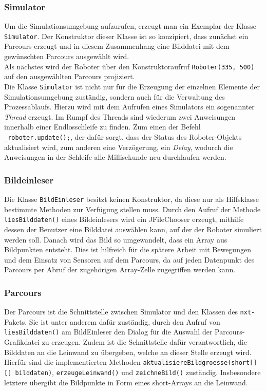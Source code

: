 \documentclass[paper=a4, DIV=calc, BCOR=15mm, twoside=on, onecolumn=on, open = right, titlepage =on, parskip =half, headsepline = on, footsepline = on, chapterprefix = off, appendixprefix = off, fontsize = 12pt, numbers = noenddot, abstract = on]{scrbook}
\begin{document}
\subsubsection{Simulator}

Um die Simulationsumgebung aufzurufen, erzeugt man ein Exemplar der Klasse \texttt{Si\-mu\-la\-tor}. Der Konstruktor dieser Klasse ist so konzipiert, dass zunächst ein Parcours erzeugt und in diesem Zusammenhang eine Bilddatei mit dem gewünschten Parcours ausgewählt wird.\\
Als nächstes wird der Roboter über den Konstruktoraufruf \texttt{Roboter(335, 500)} auf den ausgewählten Parcours projiziert.\\
Die Klasse \texttt{Simulator} ist nicht nur für die Erzeugung der einzelnen Elemente der Simulationsumgebung zuständig, sondern auch für die Verwaltung des Prozessablaufs. Hierzu wird mit dem Aufrufen eines Simulators ein sogenannter \emph{Thread} erzeugt. Im Rumpf des Threads sind wiederum zwei Anweisungen innerhalb einer Endlosschleife zu finden. Zum einen der Befehl \texttt{{\_}roboter.update();}, der dafür sorgt, dass der Status des Roboter-Objekts aktualisiert wird, zum anderen eine Verzögerung, ein \emph{Delay}, wodurch die Anweisungen in der Schleife alle Millisekunde neu durchlaufen werden. 


\subsubsection{Bildeinleser}
Die Klasse \texttt{BildEinleser} besitzt keinen Konstruktor, da diese nur als Hilfsklasse bestimmte Methoden zur Verfügung stellen muss. Durch den Aufruf der Methode\\
\texttt{liesBilddaten()} eines Bildeinlesers wird ein JFileChooser erzeugt, mithilfe dessen der Benutzer eine Bilddatei auswählen kann, auf der der Roboter simuliert werden soll. Danach wird das Bild so umgewandelt, dass ein Array aus Bildpunkten entsteht. Dies ist hilfreich für die spätere Arbeit mit Bewegungen und dem Einsatz von Sensoren auf dem Parcours, da auf jeden Datenpunkt des Parcours per Abruf der zugehörigen Array-Zelle zugegriffen werden kann.

\subsubsection{Parcours}
Der Parcours ist die Schnittstelle zwischen Simulator und den Klassen des \texttt{nxt-}Pakets. Sie ist unter anderem dafür zuständig, durch den Aufruf von \texttt{liesBilddaten()} am BildEinleser den Dialog für die Auswahl der Parcours-Grafikdatei zu erzeugen. Zudem ist die Schnittstelle dafür verantwortlich, die Bilddaten an die Leinwand zu übergeben, welche an dieser Stelle erzeugt wird. Hierfür sind die implementierten Methoden \texttt{aktualisiere\-Bildgroes\-se(short[][] bild\-daten)}, \texttt{er\-zeu\-ge\-Lein\-wand()} und \texttt{zeichneBild()} zuständig. Insbesondere letztere übergibt die Bildpunkte in Form eines short-Arrays an die Leinwand.
\end{document}

